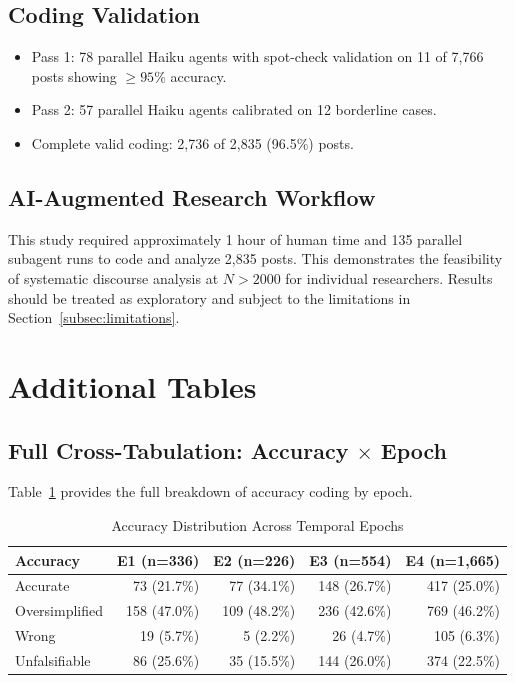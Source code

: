 \documentclass[11pt,preprint]{article}
\begin{document}
\subsection{Coding Validation}
\begin{itemize}
  \item Pass 1: 78 parallel Haiku agents with spot-check validation on 11 of 7,766 posts showing $\geq 95\%$ accuracy.
  \item Pass 2: 57 parallel Haiku agents calibrated on 12 borderline cases.
  \item Complete valid coding: 2,736 of 2,835 (96.5\%) posts.
\end{itemize}

\subsection{AI-Augmented Research Workflow}
This study required approximately 1 hour of human time and 135 parallel subagent runs to code and analyze 2,835 posts. This demonstrates the feasibility of systematic discourse analysis at $N > 2000$ for individual researchers. Results should be treated as exploratory and subject to the limitations in Section~\ref{subsec:limitations}.

\appendix

\section{Additional Tables}
\label{app:tables}

\subsection{Full Cross-Tabulation: Accuracy $\times$ Epoch}

Table~\ref{tab:app_accuracy_epoch_full} provides the full breakdown of accuracy coding by epoch.

\begin{table}[h]
\centering
\caption{Accuracy Distribution Across Temporal Epochs}
\label{tab:app_accuracy_epoch_full}
\begin{tabular}{lrrrr}
\toprule
\textbf{Accuracy} & \textbf{E1 (n=336)} & \textbf{E2 (n=226)} & \textbf{E3 (n=554)} & \textbf{E4 (n=1,665)} \\
\midrule
Accurate & 73 (21.7\%) & 77 (34.1\%) & 148 (26.7\%) & 417 (25.0\%) \\
Oversimplified & 158 (47.0\%) & 109 (48.2\%) & 236 (42.6\%) & 769 (46.2\%) \\
Wrong & 19 (5.7\%) & 5 (2.2\%) & 26 (4.7\%) & 105 (6.3\%) \\
Unfalsifiable & 86 (25.6\%) & 35 (15.5\%) & 144 (26.0\%) & 374 (22.5\%) \\
\bottomrule
\end{tabular}
\end{table}
\end{document}
